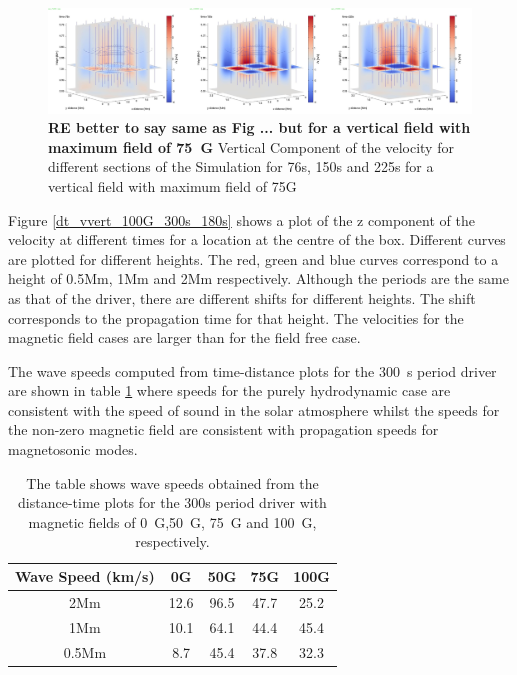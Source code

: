 \documentclass{aastex62}
\begin{document}
\begin{figure}[h]\label{vzplot_bv75g_76_150_225}
\includegraphics[scale=0.15]{imrescale/vz_bv75g_76_150_225.jpg}
\caption{{\bf RE better to say same as Fig ... but for a vertical field with maximum field of 75~G} Vertical Component of the velocity for different sections of the Simulation for 76s, 150s and 225s for a vertical field with maximum field of 75G}
\end{figure}



Figure \ref{dt_vvert_100G_300s_180s} shows a plot of the z component of the velocity at different times for a location at the centre of the box. Different curves are plotted for different heights. The red, green and blue curves correspond to a height  of 0.5Mm, 1Mm and 2Mm respectively. Although the periods are the same as that of the driver, there are different shifts for different heights. The shift corresponds to the propagation time for that height. The velocities for the magnetic field cases are larger than for the field free case.


The wave speeds computed from time-distance plots for the 300~s period driver are shown in table \ref{Tablewavespeeds_300s} where speeds for the purely hydrodynamic case are consistent with the speed of sound in the solar atmosphere whilst the speeds for the non-zero magnetic field are consistent with propagation speeds for magnetosonic modes. 
\begin{table}\label{wavespeeds}
\centering
\begin{tabular}{c c c c c}
\hline
Wave Speed (km/s)   &  0G  &  50G &  75G & 100G\\
\hline
2Mm & 12.6  &   96.5       &   47.7      &  25.2     \\
\hline
1Mm & 10.1  &    64.1      &   44.4     &   45.4      \\
\hline
0.5Mm & 8.7  &   45.4      &   37.8      &   32.3    \\
\hline

\end{tabular} 
\caption{The table shows wave speeds obtained from the distance-time plots for the 300s period driver with magnetic fields of 0~G,50~G, 75~G and 100~G, respectively.}
\label{Tablewavespeeds_300s}
\end{table}
\end{document}
